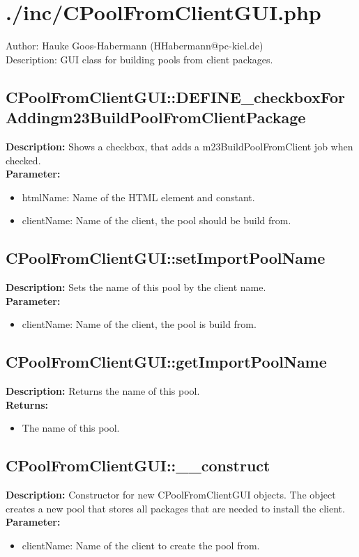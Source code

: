 \newpage\section{./inc/CPoolFromClientGUI.php}
 Author: Hauke Goos-Habermann (HHabermann@pc-kiel.de)\\
 Description: GUI class for building pools from client packages.\\

\subsection{CPoolFromClientGUI::DEFINE\_checkboxForAddingm23BuildPoolFromClientPackage}
\textbf{Description:} Shows a checkbox, that adds a m23BuildPoolFromClient job when checked.\\
\textbf{Parameter:}
\begin{itemize}
\item htmlName: Name of the HTML element and constant.
\item clientName: Name of the client, the pool should be build from.
\end{itemize}

\subsection{CPoolFromClientGUI::setImportPoolName}
\textbf{Description:} Sets the name of this pool by the client name.\\
\textbf{Parameter:}
\begin{itemize}
\item clientName: Name of the client, the pool is build from.
\end{itemize}

\subsection{CPoolFromClientGUI::getImportPoolName}
\textbf{Description:} Returns the name of this pool.\\
\textbf{Returns:}
\begin{itemize}
\item The name of this pool.
\end{itemize}

\subsection{CPoolFromClientGUI::\_\_construct}
\textbf{Description:} Constructor for new CPoolFromClientGUI objects. The object creates a new pool that stores all packages that are needed to install the client.\\
\textbf{Parameter:}
\begin{itemize}
\item clientName: Name of the client to create the pool from.
\end{itemize}

